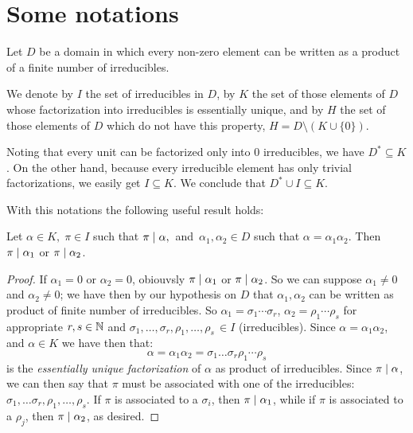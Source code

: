 \section{Some notations}\label{notations}

Let $D$ be a domain in which every non-zero element can
be written as a product of a finite number of irreducibles.

We denote by $I$ the set of irreducibles in $D$, by $K$
the set of those elements of $D$ whose factorization
into irreducibles is essentially unique, and by $H$ the
set of those elements of $D$ which do not have this
property, \ie $H = D\setminus \left(K \cup \{0\}\right)$.

Noting that every unit can be factorized only into $0$
irreducibles, we have $D^\ast \subseteq K$. On the other
hand, because every irreducible element has only trivial
factorizations, we easily get $I\subseteq K$. We conclude
that $D^\ast \cup I\subseteq K$.

\medskip
With this notations the following useful result holds:

\begin{lem}
Let $\alpha \in K,\; \pi \in I$ such that $\pi \mid
\alpha,\, $ and\, \mbox{$\alpha_1, \alpha_2 \in D$} such
that \mbox{$\alpha = \alpha_1 \alpha_2$.}
Then $\pi \mid \alpha_1$ or $\pi \mid \alpha_2$.
\end{lem}

\begin{proof}
%
If $\alpha_1=0$ or $\alpha_2=0$, obiouvsly $\pi \mid
\alpha_1$ or $\pi \mid \alpha_2$.
So we can suppose $\alpha_1 \neq 0$ and $\alpha_2\not=0$;
we have then by our hypothesis on $D$ that $\alpha_1,
\alpha_2$ can be written as product of finite number of
irreducibles.
So $\alpha_1 = \sigma_1 \cdots \sigma_r$, $\alpha_2 =
\rho_1 \cdots \rho_s$ for appropriate $r,s \in \mathbb{N}$ and
$\sigma_1, \ldots, \sigma_r, \rho_1, \ldots, \rho_s
\,\in I$ (\ie irreducibles).
Since \mbox{$\alpha = \alpha_1 \alpha_2$}, and
$\alpha \in K$ we have then that:
$$
\alpha = \alpha_1 \alpha_2 =
\sigma_1 \ldots \sigma_r \rho_1 \cdots \rho_s 
$$
is the \emph{essentially unique factorization} of $\alpha$
as product of irreducibles.
Since $\pi \mid \alpha$, we can then say that $\pi$
must be associated with one of the irreducibles:
$\sigma_1, \ldots \sigma_r, \rho_1, \ldots, \rho_s$.
If $\pi$ is associated to a $\sigma_i$, then
$\pi \mid \alpha_1$, while if $\pi$ is associated to
a $\rho_j$, then $\pi \mid \alpha_2$, as desired. 
%
\end{proof}

